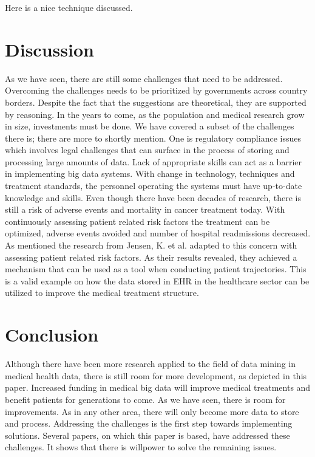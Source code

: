 Here is a nice technique discussed.\cite{medicalmining}

\section{Discussion}
As we have seen, there are still some challenges that need to be addressed. Overcoming the challenges needs to be prioritized by governments across country borders. Despite the fact that the suggestions are theoretical, they are supported by reasoning. In the years to come, as the population and medical research grow in size, investments must be done. We have covered a subset of the challenges there is; there are more to shortly mention. One is regulatory compliance issues\cite{kek} which involves legal challenges that can surface in the process of storing and processing large amounts of data. Lack of appropriate skills can act as a barrier in implementing big data systems\cite{kek}. With change in technology, techniques and treatment standards, the personnel operating the systems must have up-to-date knowledge and skills.
Even though there have been decades of research, there is still a risk of adverse events and mortality in cancer treatment today. With continuously assessing patient related risk factors the treatment can be optimized, adverse events avoided and number of hospital readmissions decreased. As mentioned the research  from Jensen, K. et al. adapted to this concern with assessing patient related risk factors. As their results revealed, they achieved a mechanism that can be used as a tool when conducting patient trajectories. This is a valid example on how the data stored in EHR in the healthcare sector can be utilized to improve the medical treatment structure. 

 
\section{Conclusion}
Although there have been more research applied to the field of data mining in medical health data, there is still room for more development, as depicted in this paper. Increased funding in medical big data will improve medical treatments and benefit patients for generations to come. As we have seen, there is room for improvements. As in any other area, there will only become more data to store and process. Addressing the challenges is the first step towards implementing solutions. Several papers, on which this paper is based, have addressed these challenges. It shows that there is willpower to solve the remaining issues. 











